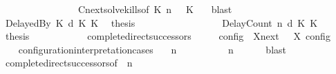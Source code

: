 \begin{isabellebody}
\ \ \ \ \ \ \ \ \ \ \ \ \ \ \ \ Cnext{\isacharunderscore}solve{\isacharunderscore}kills{\isacharbrackleft}of\ {\isacartoucheopen}K{}{\isacartoucheclose}\ {\isacartoucheopen}n{\isacartoucheclose}\ {\isacartoucheopen}{\isasymGamma}{\isacartoucheclose}\ {\isacartoucheopen}{\isasymPsi}{\isacartoucheclose}\ {\isacartoucheopen}K{}{\isacartoucheclose}\ {\isacartoucheopen}{\isasymPhi}{\isacartoucheclose}{\isacharbrackright}\ \isamarkupfalse%
\ blast\isanewline
\ \ \ \ \ \ \isamarkupfalse%
\isanewline
\ \ \ \ \ \ \ \ \isamarkupfalse%
\ {\isacharparenleft}DelayedBy\ K{}\ d\ K{}\ K{}{\isacharparenright}\ \isamarkupfalse%
\ {\isacharquery}thesis\ \isamarkupfalse%
\isanewline
\ \ \ \ \ \ \isamarkupfalse%
\isanewline
\ \ \ \ \ \ \ \ \isamarkupfalse%
\ {\isacharparenleft}DelayCount\ n\ d\ K{}\ K{}{\isacharparenright}\ \isamarkupfalse%
\ {\isacharquery}thesis\ \isamarkupfalse%
\isanewline
\ \ \ \ \ \ \isamarkupfalse%
\isanewline
\ \ \isamarkupfalse%
%
\endisatagproof
{\isafoldproof}%
%
\isadelimproof
\isanewline
%
\endisadelimproof
\isanewline
{}\isamarkupfalse%
\ complete{\isacharunderscore}direct{\isacharunderscore}successors{\isacharprime}{\isacharcolon}\isanewline
\ \ \ {\isacartoucheopen}{\isasymlbrakk}\ {\isasymS}\ {\isasymrbrakk}\isactrlsub c\isactrlsub o\isactrlsub n\isactrlsub f\isactrlsub i\isactrlsub g\ {\isasymsubseteq}\ {\isacharparenleft}{\isasymUnion}X{\isasymin}{\isasymC}\isactrlsub n\isactrlsub e\isactrlsub x\isactrlsub t\ {\isasymS}{\isachardot}\ {\isasymlbrakk}\ X\ {\isasymrbrakk}\isactrlsub c\isactrlsub o\isactrlsub n\isactrlsub f\isactrlsub i\isactrlsub g{\isacharparenright}{\isacartoucheclose}\isanewline
%
\isadelimproof
%
\endisadelimproof
%
\isatagproof
{}\isamarkupfalse%
\ {\isacharminus}\isanewline
\ \ \isamarkupfalse%
\ configuration{\isacharunderscore}interpretation{\isachardot}cases\ \isamarkupfalse%
\ {\isasymGamma}\ n\ {\isasymPsi}\ {\isasymPhi}\isanewline
\ \ \ \ \ {\isacartoucheopen}{\isasymS}\ {\isacharequal}\ {\isacharparenleft}{\isasymGamma}{\isacharcomma}\ n\ {\isasymturnstile}\ {\isasymPsi}\ {\isasymtriangleright}\ {\isasymPhi}{\isacharparenright}{\isacartoucheclose}\ \isamarkupfalse%
\ blast\isanewline
\ \ \isamarkupfalse%
\ complete{\isacharunderscore}direct{\isacharunderscore}successors{\isacharbrackleft}of\ {\isacartoucheopen}{\isasymGamma}{\isacartoucheclose}\ {\isacartoucheopen}n{\isacartoucheclose}\ {\isacartoucheopen}{\isasymPsi}{\isacartoucheclose}\ {\isacartoucheopen}{\isasymPhi}{\isacartoucheclose}{\isacharbrackright}\ \isamarkupfalse%

\end{isabellebody}
